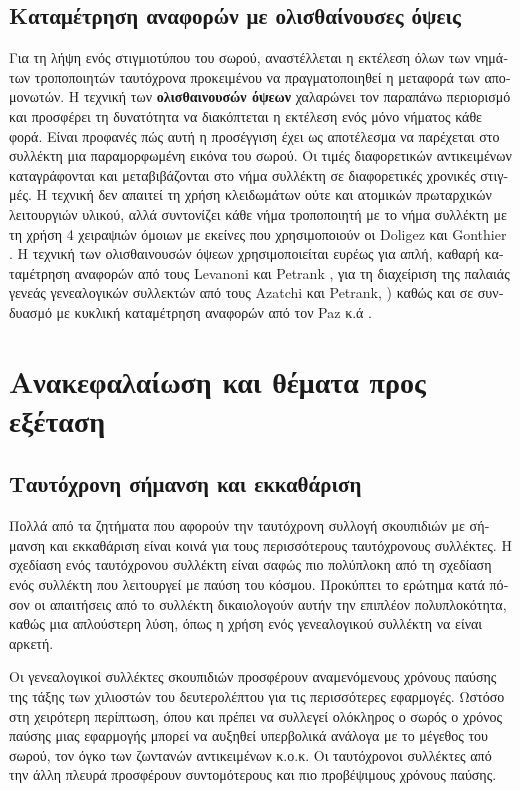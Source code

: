 \begin{greek}
\subsection{Καταμέτρηση αναφορών με ολισθαίνουσες όψεις}
Για τη λήψη ενός στιγμιοτύπου του σωρού, αναστέλλεται η
εκτέλεση όλων των νημάτων τροποποιητών ταυτόχρονα προκειμένου
να πραγματοποιηθεί η μεταφορά των απομονωτών. Η τεχνική των
\textbf{ολισθαινουσών όψεων} χαλαρώνει τον παραπάνω περιορισμό
και προσφέρει τη δυνατότητα να διακόπτεται η εκτέλεση ενός
μόνο νήματος κάθε φορά. Είναι προφανές πώς αυτή η προσέγγιση
έχει ως αποτέλεσμα να παρέχεται στο συλλέκτη μια παραμορφωμένη
εικόνα του σωρού. Οι τιμές διαφορετικών αντικειμένων
καταγράφονται και μεταβιβάζονται στο νήμα συλλέκτη σε
διαφορετικές χρονικές στιγμές. Η τεχνική δεν απαιτεί τη χρήση
κλειδωμάτων ούτε και ατομικών πρωταρχικών λειτουργιών υλικού,
αλλά συντονίζει κάθε νήμα τροποποιητή με το νήμα συλλέκτη με
τη χρήση 4 χειραψιών όμοιων με εκείνες που χρησιμοποιούν οι
Doligez και Gonthier \cite{DBLP:conf/popl/DoligezG94}. Η
τεχνική των ολισθαινουσών όψεων χρησιμοποιείται ευρέως για
απλή, καθαρή καταμέτρηση αναφορών από τους Levanoni και
Petrank \cite{levanoni1999scalable, DBLP:conf/oopsla/LevanoniP01,
DBLP:journals/toplas/LevanoniP06}, για τη διαχείριση της
παλαιάς γενεάς γενεαλογικών συλλεκτών από τους Azatchi και
Petrank, \cite{DBLP:conf/oopsla/AzatchiLPP03}) καθώς και
σε συνδυασμό με κυκλική καταμέτρηση αναφορών από τον Paz
κ.ά \cite{DBLP:conf/cc/PazPBKR05, DBLP:conf/cc/PazP07}.

\section{Ανακεφαλαίωση και θέματα προς εξέταση}
\subsection{Ταυτόχρονη σήμανση και εκκαθάριση}
Πολλά από τα ζητήματα που αφορούν την ταυτόχρονη συλλογή
σκουπιδιών με σήμανση και εκκαθάριση είναι κοινά για τους
περισσότερους ταυτόχρονους συλλέκτες. Η σχεδίαση ενός
ταυτόχρονου συλλέκτη είναι σαφώς πιο πολύπλοκη από τη
σχεδίαση ενός συλλέκτη που λειτουργεί με παύση του κόσμου.
Προκύπτει το ερώτημα κατά πόσον οι απαιτήσεις από το συλλέκτη
δικαιολογούν αυτήν την επιπλέον πολυπλοκότητα, καθώς μια
απλούστερη λύση, όπως η χρήση ενός γενεαλογικού συλλέκτη
να είναι αρκετή.

Οι γενεαλογικοί συλλέκτες σκουπιδιών προσφέρουν αναμενόμενους
χρόνους παύσης της τάξης των χιλιοστών του δευτερολέπτου για
τις περισσότερες εφαρμογές. Ωστόσο στη χειρότερη περίπτωση,
όπου και πρέπει να συλλεγεί ολόκληρος ο σωρός ο χρόνος παύσης
μιας εφαρμογής μπορεί να αυξηθεί υπερβολικά ανάλογα με το
μέγεθος του σωρού, τον όγκο των ζωντανών αντικειμένων κ.ο.κ.
Οι ταυτόχρονοι συλλέκτες από την άλλη πλευρά προσφέρουν
συντομότερους και πιο προβέψιμους χρόνους παύσης.


\end{greek}
